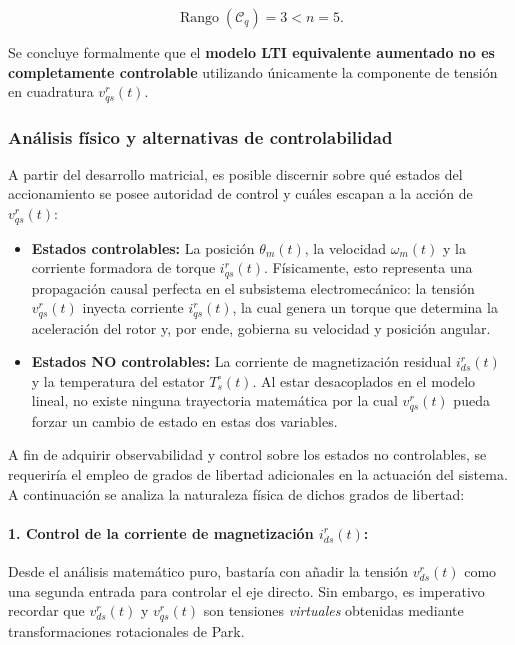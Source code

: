 \documentclass[10pt,a4paper]{article}
\begin{document}
\begin{equation}
    \operatorname{Rango}(\mathcal{C}_q) = 3 < n = 5.
\end{equation}

Se concluye formalmente que el \textbf{modelo LTI equivalente aumentado no es completamente controlable} utilizando únicamente la componente de tensión en cuadratura $v_{qs}^r(t)$.

\subsubsection{Análisis físico y alternativas de controlabilidad}

A partir del desarrollo matricial, es posible discernir sobre qué estados del accionamiento se posee autoridad de control y cuáles escapan a la acción de $v_{qs}^r(t)$:

\begin{itemize}
    \item \textbf{Estados controlables:} La posición $\theta_m(t)$, la velocidad $\omega_m(t)$ y la corriente formadora de torque $i_{qs}^r(t)$. Físicamente, esto representa una propagación causal perfecta en el subsistema electromecánico: la tensión $v_{qs}^r(t)$ inyecta corriente $i_{qs}^r(t)$, la cual genera un torque que determina la aceleración del rotor y, por ende, gobierna su velocidad y posición angular.
    
    \item \textbf{Estados NO controlables:} La corriente de magnetización residual $i_{ds}^r(t)$ y la temperatura del estator $T_s^\circ(t)$. Al estar desacoplados en el modelo lineal, no existe ninguna trayectoria matemática por la cual $v_{qs}^r(t)$ pueda forzar un cambio de estado en estas dos variables.
\end{itemize}

A fin de adquirir observabilidad y control sobre los estados no controlables, se requeriría el empleo de grados de libertad adicionales en la actuación del sistema. A continuación se analiza la naturaleza física de dichos grados de libertad:

\paragraph{1. Control de la corriente de magnetización $i_{ds}^r(t)$:}
Desde el análisis matemático puro, bastaría con añadir la tensión $v_{ds}^r(t)$ como una segunda entrada para controlar el eje directo. Sin embargo, es imperativo recordar que $v_{ds}^r(t)$ y $v_{qs}^r(t)$ son tensiones \textit{virtuales} obtenidas mediante transformaciones rotacionales de Park. 
\end{document}
